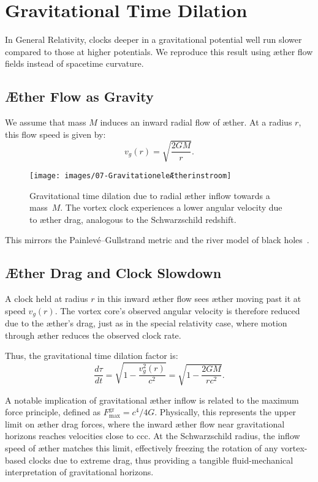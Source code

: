 \section{Gravitational Time Dilation}

In General Relativity, clocks deeper in a gravitational potential well run slower compared to those at higher potentials. We reproduce this result using æther flow fields instead of spacetime curvature.

\subsection*{Æther Flow as Gravity}

We assume that mass $M$ induces an inward radial flow of æther. At a radius $r$, this flow speed is given by:
\[
v_g(r) = \sqrt{\frac{2GM}{r}}.
\]

\begin{figure}[htbp]
    \centering
    \texttt{[image: images/07-GravitationeleÆtherinstroom]}
    \caption{Gravitational time dilation due to radial æther inflow towards a mass~$M$. The vortex clock experiences a lower angular velocity due to æther drag, analogous to the Schwarzschild redshift.}
    \label{fig:GravitationeleÆtherinstroom}
\end{figure}

This mirrors the Painlevé–Gullstrand metric and the river model of black holes~\cite{Hamilton2004-river}.

\subsection*{Æther Drag and Clock Slowdown}

A clock held at radius $r$ in this inward æther flow sees æther moving past it at speed $v_g(r)$. The vortex core's observed angular velocity is therefore reduced due to the æther's drag, just as in the special relativity case, where motion through æther reduces the observed clock rate.

Thus, the gravitational time dilation factor is:
\[
\frac{d\tau}{dt} = \sqrt{1 - \frac{v_g^2(r)}{c^2}} = \sqrt{1 - \frac{2GM}{rc^2}}. \tag{4}
\]

A notable implication of gravitational æther inflow is related to the maximum force principle, defined as $F^{\text{gr}}_{\text{max}} = c^4 /4G$. Physically, this represents the upper limit on æther drag forces, where the inward æther flow near gravitational horizons reaches velocities close to ccc. At the Schwarzschild radius, the inflow speed of æther matches this limit, effectively freezing the rotation of any vortex-based clocks due to extreme drag, thus providing a tangible fluid-mechanical interpretation of gravitational horizons.

